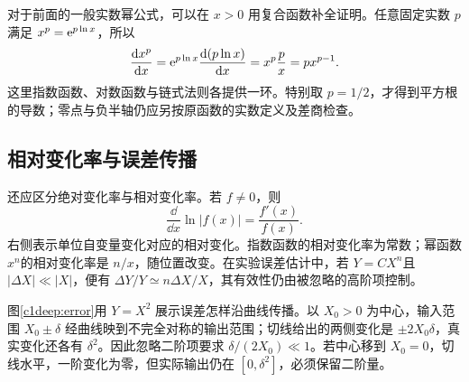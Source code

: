 对于前面的一般实数幂公式，可以在 $x>0$ 用复合函数补全证明。任意固定实数 $p$ 满足 $x^p=\mathrm e^{p\ln x}$，所以
\[
 \frac{\mathop{}\!\mathrm d x^p}{\mathop{}\!\mathrm d x}
 =\mathrm e^{p\ln x}\frac{\mathop{}\!\mathrm d(p\ln x)}{\mathop{}\!\mathrm d x}
 =x^p\frac p x=px^{p-1}.
\]
这里指数函数、对数函数与链式法则各提供一环。特别取 $p=1/2$，才得到平方根的导数；零点与负半轴仍应另按原函数的实数定义及差商检查。

\subsection{相对变化率与误差传播}
还应区分绝对变化率与相对变化率。若 $f\ne0$，则
\[\frac{\dd}{\dd x}\ln|f(x)|=\frac{f'(x)}{f(x)}.\]
右侧表示单位自变量变化对应的相对变化。指数函数的相对变化率为常数；幂函数 $x^n$的相对变化率是 $n/x$，随位置改变。在实验误差估计中，若 $Y=CX^n$且 $|\Delta X|\ll|X|$，便有 $\Delta Y/Y\simeq n\Delta X/X$，其有效性仍由被忽略的高阶项控制。



图\ref{c1deep:error}用 $Y=X^2$ 展示误差怎样沿曲线传播。以 $X_0>0$ 为中心，输入范围 $X_0\pm\delta$ 经曲线映到不完全对称的输出范围；切线给出的两侧变化是 $\pm2X_0\delta$，真实变化还各有 $\delta^2$。因此忽略二阶项要求 $\delta/(2X_0)\ll1$。若中心移到 $X_0=0$，切线水平，一阶变化为零，但实际输出仍在 $[0,\delta^2]$，必须保留二阶量。


